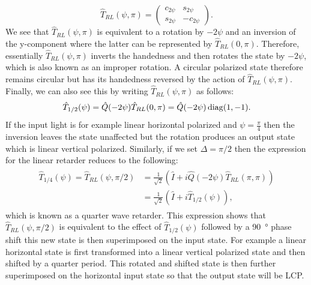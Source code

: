 \begin{equation}
    \hat{T}_{RL}(\psi, \pi)= 
    \begin{pmatrix} 
    c_{2\psi} & s_{2\psi} \\
    s_{2\psi} & -c_{2\psi}
    \end{pmatrix}.
\end{equation}
We see that $\hat{T}_{RL}(\psi, \pi)$ is equivalent to a rotation by $-2\psi$ and an inversion of the y-component where the latter can be represented by $\hat{T}_{RL}(0, \pi)$. Therefore, essentially $\hat{T}_{RL}(\psi, \pi)$ inverts the handedness and then rotates the state by $-2\psi$, which is also known as an improper rotation. A circular polarized state therefore remains circular but has its handedness reversed by the action of $\hat{T}_{RL}(\psi, \pi)$. Finally, we can also see this by writing $\hat{T}_{RL}(\psi, \pi)$ as follows:
\begin{equation}
    \label{eq:l2_wp_effect}
    \hat{T}_{1/2}(\psi)=
    \hat{Q}(-2\psi)\hat{T}_{RL}(0, \pi)=\hat{Q}(-2\psi)\operatorname{diag}(1,-1).
\end{equation}
If the input light is for example linear horizontal polarized and $\psi=\frac{\pi}{4}$ then the inversion leaves the state unaffected but the rotation produces an output state which is linear vertical polarized.
Similarly, if we set $\Delta=\pi/2$ then the expression for the linear retarder reduces to the following:
\begin{align}
\begin{split}
    \hat{T}_{1/4}(\psi)=\hat{T}_{RL}(\psi, \pi/2)
    &=\frac{1}{\sqrt{2}}\left(\hat{I}+i\hat{Q}(-2\psi)\hat{T}_{RL}(\pi, \pi)\right)
    \\
    &=\frac{1}{\sqrt{2}}\left(\hat{I}+i\hat{T}_{1/2}(\psi)\right),
\end{split}
\end{align}
which is known as a quarter wave retarder. This expression shows that $\hat{T}_{RL}(\psi, \pi/2)$ is equivalent to the effect of $\hat{T}_{1/2}(\psi)$ followed by a \SI{90}{\degree} phase shift this new state is then superimposed on the input state. For example a linear horizontal state is first transformed into a linear vertical polarized state and then shifted by a quarter period. This rotated and shifted state is then further superimposed on the horizontal input state so that the output state will be LCP. 

